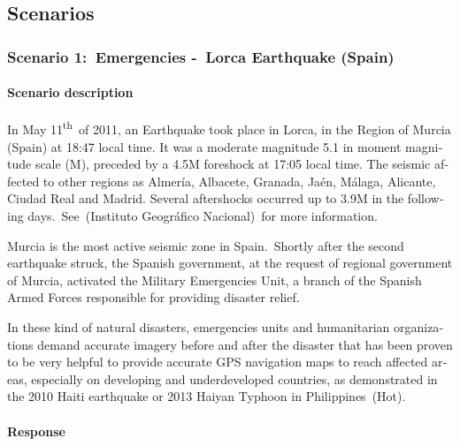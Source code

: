 \documentclass[a4paper]{article}
\begin{document}
\bigskip


\bigskip


\bigskip

\subsection[Scenarios]{Scenarios}
\hypertarget{Toc381777193}{}\subsubsection[Scenario 1:\ Emergencies
{}-\ Lorca Earthquake (Spain)]{Scenario
1:\ \foreignlanguage{english}{Emergencies
-}\foreignlanguage{english}{\ }\foreignlanguage{english}{Lorca
Earthquake (Spain)}}
\hypertarget{Toc381777194}{}\paragraph[Scenario description]{Scenario
description}
\foreignlanguage{english}{In May
11}\foreignlanguage{english}{\textsuperscript{th}}\foreignlanguage{english}{\ of
2011, an Earthquake took place in Lorca, in the Region of Murcia
(Spain) at 18:47 local time. It was a moderate magnitude 5.1 in moment
magnitude scale (M), preceded by a 4.5M foreshock at 17:05 local time.
The seismic affected to other regions as Almer\'ia, Albacete, Granada,
Ja\'en, M\'alaga, Alicante, Ciudad Real and Madrid. Several aftershocks
occurred up to 3.9M in the following days.\ }See\ (Instituto
Geogr\'afico Nacional)\ for more information.


\bigskip

{
Murcia is the most active seismic zone in Spain.\ Shortly after the
second earthquake struck, the Spanish government, at the request of
regional government of Murcia, activated the Military Emergencies Unit,
a branch of the Spanish Armed Forces responsible for providing disaster
relief.\ }


\bigskip

\foreignlanguage{english}{In these kind of natural disasters,
emergencies units and humanitarian organizations demand accurate
imagery before and after the disaster that has been proven to be very
helpful to provide accurate GPS navigation maps to reach affected
areas, especially on developing and underdeveloped countries, as
demonstrated in the 2010 Haiti earthquake or 2013 Haiyan Typhoon in
Philippines\ }(Hot)\foreignlanguage{english}{.}

\paragraph[Response]{ Response}
\end{document}
